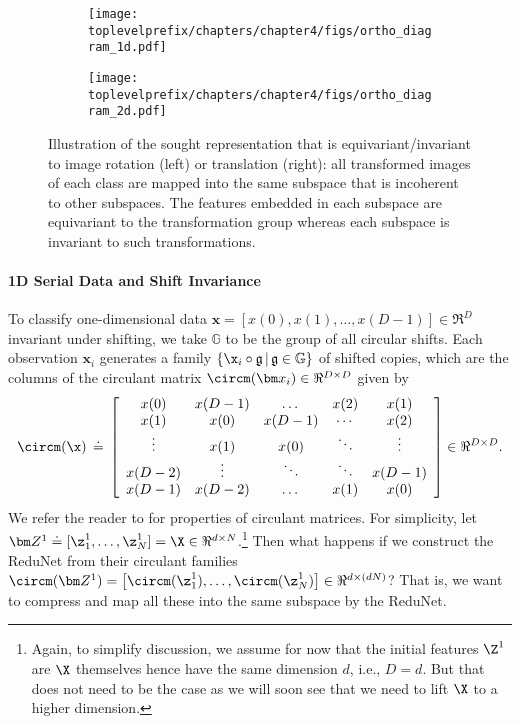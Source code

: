 \documentclass[../../book-main.tex]{subfiles}
\begin{document}
\begin{figure}[t]
    \begin{subfigure}[t]{0.4\textwidth}
        \centering 
        \texttt{[image: \\toplevelprefix/chapters/chapter4/figs/ortho\_diagram\_1d.pdf]}
    \end{subfigure}
    \hfill 
    \begin{subfigure}[t]{0.4\textwidth}
        \centering 
        \texttt{[image: \\toplevelprefix/chapters/chapter4/figs/ortho\_diagram\_2d.pdf]}
    \end{subfigure}
    \caption{Illustration of the sought representation that is equivariant/invariant to image rotation (left) or translation (right): all transformed images of each class are mapped into the same subspace that is incoherent to other subspaces. The features embedded in each subspace are equivariant to the transformation group whereas each subspace is invariant to such transformations.}\label{fig:ortho-invariance-diagram} 
\end{figure}

\paragraph{1D Serial Data and  Shift Invariance} To classify one-dimensional data $\bm x = [x(0), x(1), \ldots, x(D-1)] \in \Re^D$ invariant under shifting, we take $\mathbb{G}$ to be the group of all circular shifts. Each observation $\bm x_i$ generates a family $\{ \x_i \circ \mathfrak{g} \, | \, \mathfrak{g} \in \mathbb G \}$ of shifted copies, which are the columns of the circulant matrix $\circm(\bm x_i) \in \Re^{D \times D}$ given by
\begin{equation}
\circm(\x) \,\doteq\, \left[ \begin{array}{ccccc} x(0) & x(D-1) & \dots & x(2) & x(1) \\ x(1) & x(0) & x(D-1) & \cdots & x(2) \\ \vdots & x(1) & x(0) &\ddots & \vdots \\ x(D-2) &  \vdots & \ddots & \ddots & x(D-1) \\ x(D-1) & x(D-2) & \dots & x(1) & x(0)   \end{array} \right]  \in \Re^{D \times D}.
\end{equation}
We refer the reader to \cite{Kra2012OnCM} for properties of circulant matrices. For simplicity, let $\bm Z^1 \doteq [ \z_{1}^1, \dots, \z_{N}^1 ] = \X \in \Re^{d \times N}$.\footnote{Again, to simplify discussion, we assume for now that the initial features $\Z^1$ are $\X$ themselves hence have the same dimension $d$, i.e., $D=d$. But that does not need to be the case as we will soon see that we need to lift $\X$ to a higher dimension.} Then what happens if we construct the ReduNet from their circulant families $\circm(\bm Z^1) = \left[ \circm(\z_{1}^1), \dots, \circm(\z_{N}^1) \right] \in \Re^{d \times (dN)}$? That is, we want to compress and map all these into the same subspace by the ReduNet. 
\end{document}
